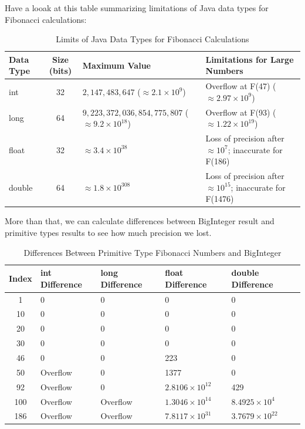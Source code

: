 \documentclass{article}
\begin{document}
Have a looak at this table summarizing limitations of Java data types for Fibonacci calculations:
\begin{table}[H]
\centering
\small
\caption{Limits of Java Data Types for Fibonacci Calculations}
\begin{tabularx}{\textwidth}{l c X X}
\toprule
\textbf{Data Type} & \textbf{Size (bits)} & \textbf{Maximum Value} & \textbf{Limitations for Large Numbers} \\
\midrule
int & 32 & $2,147,483,647$ ($\approx 2.1 \times 10^9$) & Overflow at F(47) ($\approx 2.97 \times 10^9$) \\
long & 64 & $9,223,372,036,854,775,807$ ($\approx 9.2 \times 10^{18}$) & Overflow at F(93) ($\approx 1.22 \times 10^{19}$) \\
float & 32 & $\approx 3.4 \times 10^{38}$ & Loss of precision after $\approx 10^7$; inaccurate for F(186) \\
double & 64 & $\approx 1.8 \times 10^{308}$ & Loss of precision after $\approx 10^{15}$; inaccurate for F(1476) \\
\bottomrule
\end{tabularx}
\end{table}
More than that, we can calculate differences between BigInteger result and primitive types results to see how much precision we lost.
\begin{table}[H]
\centering
\small
\caption{Differences Between Primitive Type Fibonacci Numbers and BigInteger}
\begin{tabularx}{\textwidth}{c X X X X}
\toprule
\textbf{Index} & \textbf{int Difference} & \textbf{long Difference} & \textbf{float Difference} & \textbf{double Difference} \\
\midrule
1 & 0 & 0 & 0 & 0 \\
10 & 0 & 0 & 0 & 0 \\
20 & 0 & 0 & 0 & 0 \\
30 & 0 & 0 & 0 & 0 \\
46 & 0 & 0 & 223 & 0 \\
50 & Overflow & 0 & 1377 & 0 \\
92 & Overflow & 0 & $2.8106 \times 10^{12}$ & 429 \\
100 & Overflow & Overflow & $1.3046 \times 10^{14}$ & $8.4925 \times 10^{4}$ \\
186 & Overflow & Overflow & $7.8117 \times 10^{31}$ & $3.7679 \times 10^{22}$ \\
\bottomrule
\end{tabularx}
\end{table}
\end{document}
